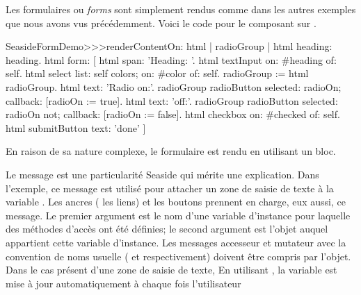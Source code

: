 \documentclass[a4paper,10pt,twoside]{book}
\begin{document}
Les formulaires ou \emph{forms} sont simplement rendus comme dans les
autres exemples que nous avons vus précédemment.
Voici le code pour le composant  sur
.


\begin{code}{} %
SeasideFormDemo>>>renderContentOn: html
	| radioGroup |
	html heading: heading.
	html form: [
		html span: 'Heading: '.
		html textInput on: #heading of: self.
		html select
			list: self colors;
			on: #color of: self.
		radioGroup := html radioGroup.
		html text: 'Radio on:'.
		radioGroup radioButton
			selected: radioOn;
			callback: [radioOn := true].
		html text: 'off:'.
		radioGroup radioButton
			selected: radioOn not;
			callback: [radioOn := false].
		html checkbox on: #checked of: self.
		html submitButton
			text: 'done' ]
\end{code}{}

En raison de sa nature complexe, le formulaire est rendu en utilisant
un bloc.

Le message  est une particularité Seaside
qui mérite une explication.
Dans l'exemple, ce message est utilisé pour attacher un zone de saisie
de texte à la variable .
Les ancres (\ie{} les liens) et les boutons prennent en charge, eux
aussi, ce message.
Le premier argument est le nom d'une variable d'instance pour laquelle
des méthodes d'accès
ont été définies; le second argument est l'objet auquel appartient
cette variable d'instance.
Les messages accesseur et mutateur avec la convention de noms usuelle
(\ie{}  et  respectivement) 
doivent être compris par l'objet.
Dans le cas présent d'une zone de saisie de texte, 
En utilisant , la variable  est
mise à jour automatiquement à chaque fois l'utilisateur 
\end{document}

